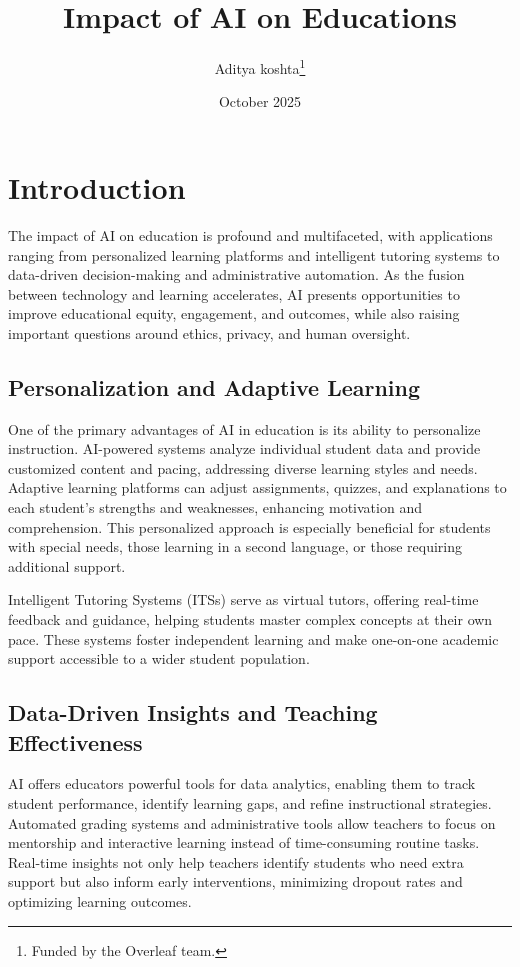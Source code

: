 \documentclass[12pt, letterpaper]{article}
\title{Impact of AI on Educations}
\author{Aditya koshta\thanks{Funded by the Overleaf team.}}
\date{October 2025}
\begin{document}
\maketitle
\section{Introduction}
The impact of AI on education is profound and multifaceted, with applications ranging from personalized learning platforms and intelligent tutoring systems to data-driven decision-making and administrative automation. As the fusion between technology and learning accelerates, AI presents opportunities to improve educational equity, engagement, and outcomes, while also raising important questions around ethics, privacy, and human oversight.


\subsection{Personalization and Adaptive Learning}
One of the primary advantages of AI in education is its ability to personalize instruction. AI-powered systems analyze individual student data and provide customized content and pacing, addressing diverse learning styles and needs. Adaptive learning platforms can adjust assignments, quizzes, and explanations to each student’s strengths and weaknesses, enhancing motivation and comprehension. This personalized approach is especially beneficial for students with special needs, those learning in a second language, or those requiring additional support.

Intelligent Tutoring Systems (ITSs) serve as virtual tutors, offering real-time feedback and guidance, helping students master complex concepts at their own pace. These systems foster independent learning and make one-on-one academic support accessible to a wider student population.

\subsection{Data-Driven Insights and Teaching Effectiveness}
AI offers educators powerful tools for data analytics, enabling them to track student performance, identify learning gaps, and refine instructional strategies. Automated grading systems and administrative tools allow teachers to focus on mentorship and interactive learning instead of time-consuming routine tasks. Real-time insights not only help teachers identify students who need extra support but also inform early interventions, minimizing dropout rates and optimizing learning outcomes.
\end{document}
